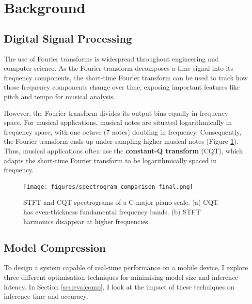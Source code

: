 \documentclass{article}
\begin{document}
\section{Background}\label{sec:background}

\subsection{Digital Signal Processing}\label{sec:dsp}
The use of Fourier transforms is widespread throughout engineering and computer science. As the Fourier transform decomposes a time signal into its frequency components, the short-time Fourier transform can be used to track how those frequency components change over time, exposing important features like pitch and tempo for musical analysis.

However, the Fourier transform divides its output bins equally in frequency space. For musical applications, musical notes are situated logarithmically in frequency space, with one octave (7 notes) doubling in frequency. Consequently, the Fourier transform ends up under-sampling higher musical notes (Figure \ref{fig:cqt-comparison}). Thus, musical applications often use the \textbf{constant-Q transform} (CQT), which adapts the short-time Fourier transform to be logarithmically spaced in frequency.
\begin{figure}[h]
    \centering
    \texttt{[image: figures/spectrogram\_comparison\_final.png]}
    \caption{STFT and CQT spectrograms of a C-major piano scale. (a) CQT has even-thickness fundamental frequency bands. (b) STFT harmonics disappear at higher frequencies.}
    \label{fig:cqt-comparison}
\end{figure}

\subsection{Model Compression}\label{sec:compression}
To design a system capable of real-time performance on a mobile device, I explore three different optimisation techniques for minimising model size and inference latency. In Section \ref{sec:evalcomp}, I look at the impact of these techniques on inference time and accuracy.
\end{document}
